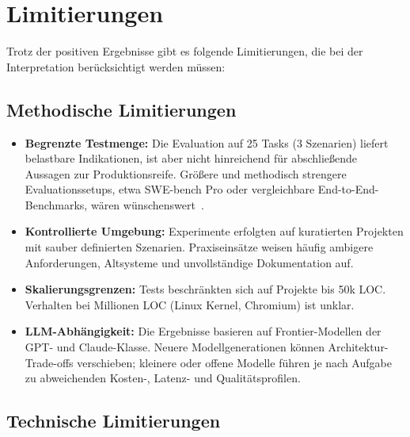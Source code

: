 \section{Limitierungen}

Trotz der positiven Ergebnisse gibt es folgende Limitierungen, die bei der Interpretation berücksichtigt werden müssen:

\subsection{Methodische Limitierungen}

\begin{itemize}
  \item \textbf{Begrenzte Testmenge:} Die Evaluation auf 25 Tasks (3 Szenarien) liefert belastbare Indikationen, ist aber nicht hinreichend für abschließende Aussagen zur Produktionsreife. Größere und methodisch strengere Evaluationssetups, etwa SWE-bench Pro oder vergleichbare End-to-End-Benchmarks, wären wünschenswert~\cite{openai2026swebenchverified,swebench2026leaderboard}.
  
  \item \textbf{Kontrollierte Umgebung:} Experimente erfolgten auf kuratierten Projekten mit sauber definierten Szenarien. Praxiseinsätze weisen häufig ambigere Anforderungen, Altsysteme und unvollständige Dokumentation auf.
  
  \item \textbf{Skalierungsgrenzen:} Tests beschränkten sich auf Projekte bis 50k LOC. Verhalten bei Millionen LOC (Linux Kernel, Chromium) ist unklar.
  
  \item \textbf{LLM-Abhängigkeit:} Die Ergebnisse basieren auf Frontier-Modellen der GPT- und Claude-Klasse. Neuere Modellgenerationen können Architektur-Trade-offs verschieben; kleinere oder offene Modelle führen je nach Aufgabe zu abweichenden Kosten-, Latenz- und Qualitätsprofilen.
\end{itemize}


\subsection{Technische Limitierungen}

